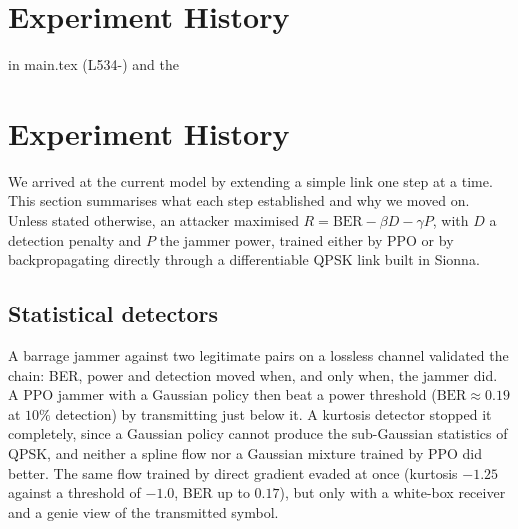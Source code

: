 \section{Experiment History} in main.tex (L534-) and the
%
%

\section{Experiment History}
\label{app:history}
We arrived at the current model by extending a simple link one step at a time.
This section summarises what each step established and why we moved on.
Unless stated otherwise, an attacker maximised $R = \mathrm{BER} - \beta D - \gamma P$, with $D$ a
detection penalty and $P$ the jammer power, trained either by PPO or by backpropagating directly
through a differentiable QPSK link built in Sionna.

\subsection{Statistical detectors}
A barrage jammer against two legitimate pairs on a lossless channel validated the chain: BER, power and
detection moved when, and only when, the jammer did.
A PPO jammer with a Gaussian policy then beat a power threshold ($\mathrm{BER} \approx 0.19$ at
$10\%$ detection) by transmitting just below it.
A kurtosis detector stopped it completely, since a Gaussian policy cannot produce the sub-Gaussian
statistics of QPSK, and neither a spline flow nor a Gaussian mixture trained by PPO did better.
The same flow trained by direct gradient evaded at once (kurtosis $-1.25$ against a threshold of
$-1.0$, BER up to $0.17$), but only with a white-box receiver and a genie view of the transmitted
symbol.

